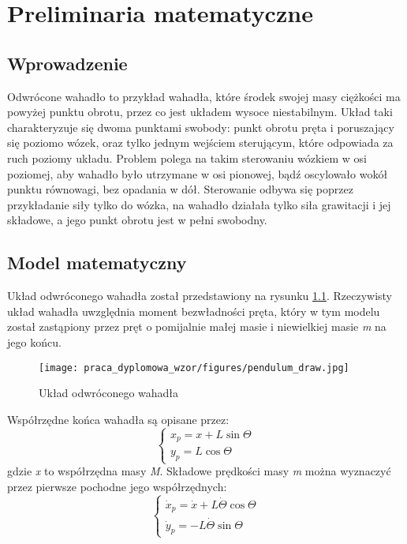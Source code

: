 \chapter{Preliminaria matematyczne}\label{ch:02}

\section{Wprowadzenie}\label{sec:intromat}

Odwrócone wahadło to przykład wahadła, które środek swojej masy ciężkości ma powyżej punktu obrotu, przez co jest układem wysoce niestabilnym. Układ taki charakteryzuje się dwoma punktami swobody: punkt obrotu pręta i poruszający się poziomo wózek, oraz tylko jednym wejściem sterującym, które odpowiada za ruch poziomy układu. Problem polega na takim sterowaniu wózkiem w osi poziomej, aby wahadło było utrzymane w osi pionowej, bądź oscylowało wokół punktu równowagi, bez opadania w dół. Sterowanie odbywa się poprzez przykładanie siły tylko do wózka, na wahadło działała tylko siła grawitacji i jej składowe, a jego punkt obrotu jest w pełni swobodny. 

\section{Model matematyczny} \label{sec:modelmat}

Układ odwróconego wahadła został przedstawiony na rysunku \ref{fig:draw}. Rzeczywisty układ wahadła uwzględnia moment bezwładności pręta, który w tym modelu został zastąpiony przez pręt o pomijalnie małej masie i niewielkiej masie \textit{m} na jego końcu. 

\begin{figure}
    \centering
    \texttt{[image: praca\_dyplomowa\_wzor/figures/pendulum\_draw.jpg]}
    \caption{Układ odwróconego wahadła}
    \label{fig:draw}
\end{figure}

Współrzędne końca wahadła są opisane przez:
\begin{equation}
    \begin{cases}
    x_{p}=x+L\sin{\Theta}\\ 
    y_{p}=L\cos{\Theta}
    \end{cases}
\end{equation}
gdzie \textit{x} to współrzędna masy \textit{M}. Składowe prędkości masy \textit{m} można wyznaczyć przez pierwsze pochodne jego współrzędnych: 
\begin{equation}
    \begin{cases}
    \dot{x}_{p}=\dot{x}+L\dot{\Theta}\cos{\Theta}\\
    \dot{y}_{p}=-L\dot{\Theta}\sin{\Theta}
    \end{cases}
    \label{skladowe}
\end{equation}

